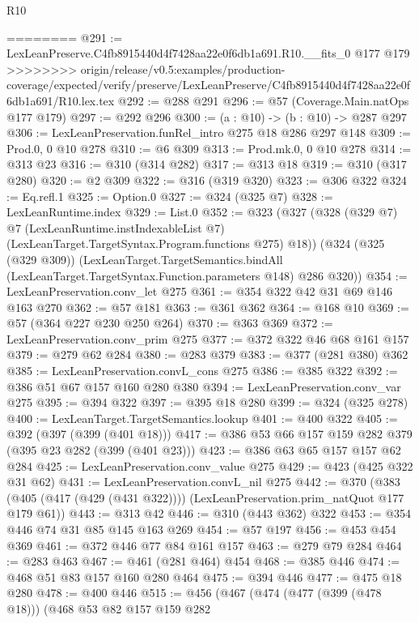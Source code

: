 \begin{lexlean}{R10}
\begin{coremodule}
{{{{{========
@291 := LexLeanPreserve.C4fb8915440d4f7428aa22e0f6db1a691.R10.__fits_0 @177 @179
>>>>>>>> origin/release/v0.5:examples/production-coverage/expected/verify/preserve/LexLeanPreserve/C4fb8915440d4f7428aa22e0f6db1a691/R10.lex.tex
@292 := @288 @291
@296 := @57 (Coverage.Main.natOps @177 @179)
@297 := @292 @296
@300 := (a : @10) -> (b : @10) -> @287 @297
@306 := LexLeanPreservation.funRel_intro @275 @18 @286 @297 @148
@309 := Prod.{0, 0} @10 @278
@310 := @6 @309
@313 := Prod.mk.{0, 0} @10 @278
@314 := @313 @23
@316 := @310 (@314 @282)
@317 := @313 @18
@319 := @310 (@317 @280)
@320 := @2 @309
@322 := @316 (@319 @320)
@323 := @306 @322
@324 := Eq.refl.{1}
@325 := Option.{0}
@327 := @324 (@325 @7)
@328 := LexLeanRuntime.index
@329 := List.{0}
@352 := @323
    (@327
      (@328
        (@329 @7)
        @7
        (LexLeanRuntime.instIndexableList @7)
        (LexLeanTarget.TargetSyntax.Program.functions @275)
        @18))
    (@324
      (@325 (@329 @309))
      (LexLeanTarget.TargetSemantics.bindAll
        (LexLeanTarget.TargetSyntax.Function.parameters @148)
        @286
        @320))
@354 := LexLeanPreservation.conv_let @275
@361 := @354 @322 @42 @31 @69 @146 @163 @270
@362 := @57 @181
@363 := @361 @362
@364 := @168 @10
@369 := @57 (@364 @227 @230 @250 @264)
@370 := @363 @369
@372 := LexLeanPreservation.conv_prim @275
@377 := @372 @322 @46 @68 @161 @157
@379 := @279 @62 @284
@380 := @283 @379
@383 := @377 (@281 @380) @362
@385 := LexLeanPreservation.convL_cons @275
@386 := @385 @322
@392 := @386 @51 @67 @157 @160 @280 @380
@394 := LexLeanPreservation.conv_var @275
@395 := @394 @322
@397 := @395 @18 @280
@399 := @324 (@325 @278)
@400 := LexLeanTarget.TargetSemantics.lookup
@401 := @400 @322
@405 := @392 (@397 (@399 (@401 @18)))
@417 := @386 @53 @66 @157 @159 @282 @379 (@395 @23 @282 (@399 (@401 @23)))
@423 := @386 @63 @65 @157 @157 @62 @284
@425 := LexLeanPreservation.conv_value @275
@429 := @423 (@425 @322 @31 @62)
@431 := LexLeanPreservation.convL_nil @275
@442 := @370
    (@383 (@405 (@417 (@429 (@431 @322)))) (LexLeanPreservation.prim_natQuot @177 @179 @61))
@443 := @313 @42
@446 := @310 (@443 @362) @322
@453 := @354 @446 @74 @31 @85 @145 @163 @269
@454 := @57 @197
@456 := @453 @454 @369
@461 := @372 @446 @77 @84 @161 @157
@463 := @279 @79 @284
@464 := @283 @463
@467 := @461 (@281 @464) @454
@468 := @385 @446
@474 := @468 @51 @83 @157 @160 @280 @464
@475 := @394 @446
@477 := @475 @18 @280
@478 := @400 @446
@515 := @456
    (@467
      (@474
        (@477 (@399 (@478 @18)))
        (@468
          @53
          @82
          @157
          @159
          @282
}}}}}
\end{coremodule}
\end{lexlean}
